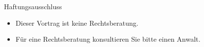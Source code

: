 \begin{frame}{Haftungsausschluss}
	\begin{itemize}
		\item Dieser Vortrag ist keine Rechtsberatung.
		\item Für eine Rechtsberatung konsultieren Sie bitte einen Anwalt.
	\end{itemize}
\end{frame}
